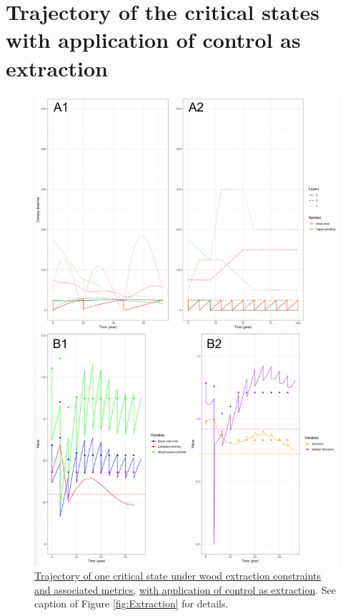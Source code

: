 \documentclass{article}
\begin{document}
\section{Trajectory of the critical states with application of control as extraction}

\begin{figure}[b]
    \centering
    \includegraphics[height=0.9\textheight]{Figure/Results/Extraction_2.png}
    \caption{\underline{Trajectory of one critical state under wood extraction constraints and associated metrics,}
    \underline{with application of control as extraction}. See caption of Figure \ref{fig:Extraction} for details.}
    \label{fig:Extraction2}
\end{figure}
\end{document}
